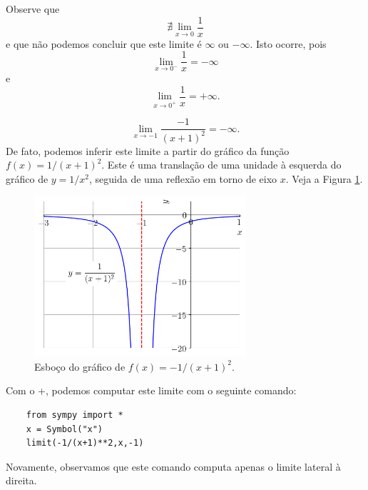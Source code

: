 \begin{ex}
  Observe que
  \begin{equation}
    \nexists \lim_{x\to 0} \frac{1}{x}
  \end{equation}
  e que não podemos concluir que este limite é $\infty$ ou $-\infty$. Isto ocorre, pois
  \begin{equation}
    \lim_{x\to 0^-} \frac{1}{x} = -\infty
  \end{equation}
  e
  \begin{equation}
    \lim_{x\to 0^+} \frac{1}{x} = +\infty.
  \end{equation}
\end{ex}

\begin{ex}
  \begin{equation}
    \lim_{x\to -1} \frac{-1}{(x+1)^2} = -\infty.
  \end{equation}
  De fato, podemos inferir este limite a partir do gráfico da função $f(x) = 1/(x+1)^2$. Este é uma translação de uma unidade à esquerda do gráfico de $y = 1/x^2$, seguida de uma reflexão em torno de eixo $x$. Veja a Figura \ref{fig:ex_liminf-1x2}.

  \begin{figure}[H]
    \centering
    \includegraphics[width=0.7\textwidth]{./cap_lim/dados/fig_ex_liminf-1x2/fig}
    \caption{Esboço do gráfico de $f(x)=-1/(x+1)^2$.}
    \label{fig:ex_liminf-1x2}
  \end{figure}

  \ifispython
  Com o {\python}+{\sympy}, podemos computar este limite com o seguinte comando:
  \begin{lstlisting}
    from sympy import *
    x = Symbol("x")
    limit(-1/(x+1)**2,x,-1)
  \end{lstlisting}
  Novamente, observamos que este comando computa apenas o limite lateral à direita.
  \fi
\end{ex}

